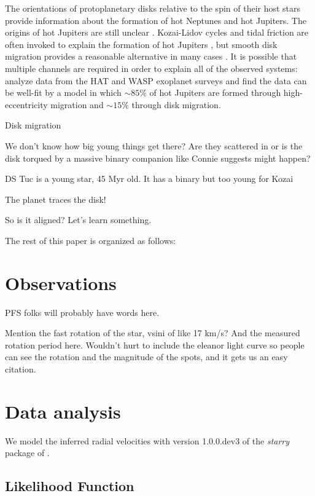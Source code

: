 \documentclass[twocolumn]{aastex62}
\begin{document}
The orientations of protoplanetary disks relative to the spin of their host stars provide information about the formation of hot Neptunes and hot Jupiters.
The origins of hot Jupiters are still unclear \citep{Dawson18}.
Kozai-Lidov cycles and tidal friction are often invoked to explain the formation of hot Jupiters \citep{Fabrycky07}, but smooth disk migration provides a reasonable alternative in many cases \citep{Ida08}. 
It is possible that multiple channels are required in order to explain all of the observed systems: \citet{Nelson17} analyze data from the HAT and WASP exoplanet surveys and find the data can be well-fit by a model in which $\sim85\%$ of hot Jupiters are formed through high-eccentricity migration and $\sim15\%$ through disk migration.

Disk migration 




We don't know how big young things get there? Are they scattered in or is the disk torqued by a massive binary companion like Connie suggests might happen?

DS Tuc is a young star, 45 Myr old. It has a binary but too young for Kozai

The planet traces the disk! 

So is it aligned? Let's learn something.

The rest of this paper is organized as follows:

\section{Observations}

PFS folks will probably have words here.

Mention the fast rotation of the star, vsini of like 17 km/s? And the measured rotation period here. Wouldn't hurt to include the eleanor light curve so people can see the rotation and the magnitude of the spots, and it gets us an easy citation.



\section{Data analysis}

We model the inferred radial velocities with version 1.0.0.dev3 of the \textit{starry} package of \citet{Luger19}. 

\subsection{Likelihood Function}
\end{document}

